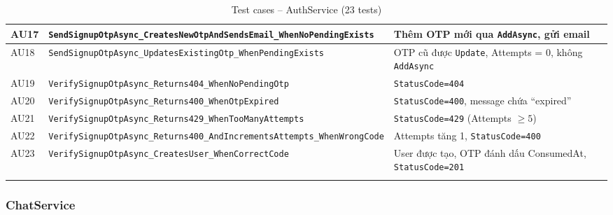\documentclass[a4paper]{article}
\begin{document}
\begin{longtable}{|C{0.8cm}|L{5.4cm}|L{7.4cm}|}
\hline
{}
AU17 & \texttt{SendSignupOtpAsync\_CreatesNewOtpAndSendsEmail\_WhenNoPendingExists} & Thêm OTP mới qua \texttt{AddAsync}, gửi email \\
\hline
AU18 & \texttt{SendSignupOtpAsync\_UpdatesExistingOtp\_WhenPendingExists} & OTP cũ được \texttt{Update}, Attempts = 0, không \texttt{AddAsync} \\
\hline
{}
AU19 & \texttt{VerifySignupOtpAsync\_Returns404\_WhenNoPendingOtp} & \texttt{StatusCode=404} \\
\hline
AU20 & \texttt{VerifySignupOtpAsync\_Returns400\_WhenOtpExpired} & \texttt{StatusCode=400}, message chứa ``expired'' \\
\hline
{}
AU21 & \texttt{VerifySignupOtpAsync\_Returns429\_WhenTooManyAttempts} & \texttt{StatusCode=429} (Attempts $\geq 5$) \\
\hline
AU22 & \texttt{VerifySignupOtpAsync\_Returns400\_AndIncrementsAttempts\_WhenWrongCode} & Attempts tăng 1, \texttt{StatusCode=400} \\
\hline
{}
AU23 & \texttt{VerifySignupOtpAsync\_CreatesUser\_WhenCorrectCode} & User được tạo, OTP đánh dấu ConsumedAt, \texttt{StatusCode=201} \\
\hline
\caption{Test cases -- AuthService (23 tests)}
\end{longtable}

\subsubsection{ChatService}
\end{document}
